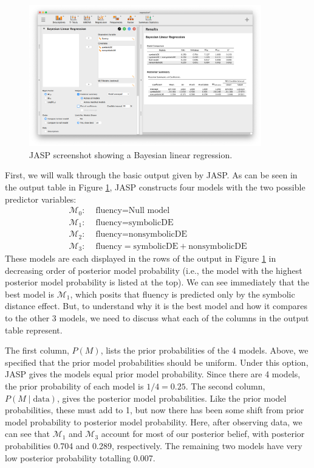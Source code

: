 \documentclass[english,,doc,floatsintext]{apa6}
\begin{document}
\begin{figure}
\centering
\includegraphics[width=0.9\textwidth,height=\textheight]{figures/regression1.png}
\caption{\label{fig:regression1}JASP screenshot showing a Bayesian linear regression.}
\end{figure}

First, we will walk through the basic output given by JASP. As can be seen in the output table in Figure \ref{fig:regression1}, JASP constructs four models with the two possible predictor variables:
\begin{align*}
\mathcal{M}_{0}: & \text{ fluency} = \text{Null model} \\
\mathcal{M}_{1}: & \text{ fluency} = \text{symbolicDE} \\
\mathcal{M}_{2}: & \text{ fluency} = \text{nonsymbolicDE} \\
\mathcal{M}_{3}: & \text{ fluency} = \text{symbolicDE}+\text{nonsymbolicDE}
\end{align*}
These models are each displayed in the rows of the output in Figure \ref{fig:regression1} in decreasing order of posterior model probability (i.e., the model with the highest posterior model probability is listed at the top). We can see immediately that the best model is \(\mathcal{M}_{1}\), which posits that fluency is predicted only by the symbolic distance effect. But, to understand why it is the best model and how it compares to the other 3 models, we need to discuss what each of the columns in the output table represent.

The first column, \(P(M)\), lists the prior probabilities of the 4 models. Above, we specified that the prior model probabilities should be uniform. Under this option, JASP gives the models equal prior model probability. Since there are 4 models, the prior probability of each model is \(1/4 = 0.25\). The second column, \(P(M \mid \text{data})\), gives the posterior model probabilities. Like the prior model probabilities, these must add to 1, but now there has been some shift from prior model probability to posterior model probability. Here, after observing data, we can see that \(\mathcal{M}_{1}\) and \(\mathcal{M}_{3}\) account for most of our posterior belief, with posterior probabilities 0.704 and 0.289, respectively. The remaining two models have very low posterior probability totalling 0.007.
\end{document}
